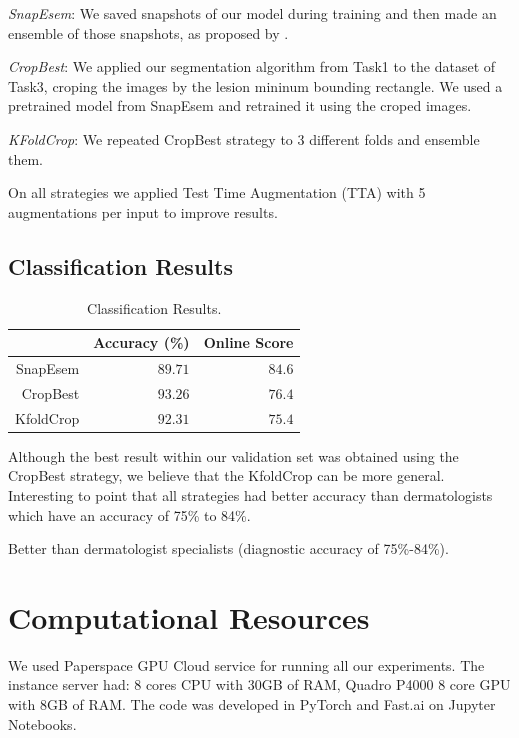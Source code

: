 \documentclass[conference]{IEEEtran}
\begin{document}
\emph{SnapEsem}: We saved snapshots of our model during training and then made an ensemble of those snapshots, as proposed by \cite{snapshots}.

\emph{CropBest}: We applied our segmentation algorithm from Task1 to the dataset of Task3, croping the images by the lesion mininum bounding rectangle. We used a pretrained model from SnapEsem and retrained it using the croped images.

\emph{KFoldCrop}: We repeated CropBest strategy to 3 different folds and ensemble them. 

On all strategies we applied Test Time Augmentation (TTA) with 5 augmentations per input to improve results.

\subsection{Classification Results}

\begin{table}[]
\centering
\caption{Classification Results.}
\label{tabela}
\begin{tabular}{@{}rrr@{}}
\toprule
            & \multicolumn{1}{c}{Accuracy (\%)} & \multicolumn{1}{c}{Online Score} \\ \midrule
SnapEsem & \(89.71\)& \(84.6\)                                  \\ \midrule
CropBest   & \(93.26\)&  \(76.4\)                                \\ \midrule
KfoldCrop    & \(92.31\)  & \(75.4\)                              \\ \bottomrule
\end{tabular}
\end{table}

Although the best result within our validation set was obtained using the CropBest strategy, we believe that the KfoldCrop can be more general. Interesting to point that all strategies had better accuracy than dermatologists which have an accuracy of 75\% to 84\%\cite{isic}. 

Better than dermatologist specialists (diagnostic accuracy of 75\%-84\%).

\section{Computational Resources\label{resources}}
We used Paperspace GPU Cloud service for running all our experiments. The instance server had: 8 cores CPU with 30GB of RAM, Quadro P4000 8 core GPU with 8GB of RAM. 
The code was developed in PyTorch and Fast.ai\cite{fastai} on Jupyter Notebooks.
\end{document}
